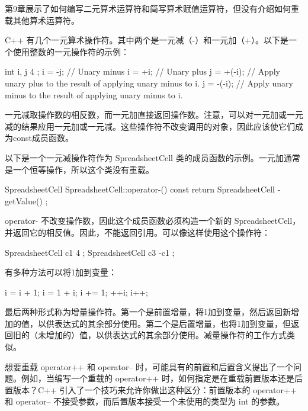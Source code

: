 
第9章展示了如何编写二元算术运算符和简写算术赋值运算符，但没有介绍如何重载其他算术运算符。


C++ 有几个一元算术操作符。其中两个是一元减（-）和一元加（+）。以下是一个使用整数的一元操作符的示例：

\begin{cpp}
int i, j { 4 };
i = -j; // Unary minus
i = +i; // Unary plus
j = +(-i); // Apply unary plus to the result of applying unary minus to i.
j = -(-i); // Apply unary minus to the result of applying unary minus to i.
\end{cpp}

一元减取操作数的相反数，而一元加直接返回操作数。注意，可以对一元加或一元减的结果应用一元加或一元减。这些操作符不改变调用的对象，因此应该使它们成为const成员函数。

以下是一个一元减操作符作为 SpreadsheetCell 类的成员函数的示例。一元加通常是一个恒等操作，所以这个类没有重载。

\begin{cpp}
SpreadsheetCell SpreadsheetCell::operator-() const
{
    return SpreadsheetCell { -getValue() };
}
\end{cpp}

operator- 不改变操作数，因此这个成员函数必须构造一个新的 SpreadsheetCell， 并返回它的相反值。因此，不能返回引用。可以像这样使用这个操作符：

\begin{cpp}
SpreadsheetCell c1 { 4 };
SpreadsheetCell c3 { -c1 };
\end{cpp}


有多种方法可以将1加到变量：

\begin{cpp}
i = i + 1;
i = 1 + i;
i += 1;
++i;
i++;
\end{cpp}

最后两种形式称为增量操作符。第一个是前置增量，将1加到变量，然后返回新增加的值，以供表达式的其余部分使用。第二个是后置增量，也将1加到变量，但返回旧的（未增加的）值，以供表达式的其余部分使用。减量操作符的工作方式类似。

想要重载 operator++ 和 operator-- 时，可能具有的前置和后置含义提出了一个问题。例如，当编写一个重载的 operator++ 时，如何指定是在重载前置版本还是后置版本？C++ 引入了一个技巧来允许你做出这种区分：前置版本的 operator++ 和 operator-- 不接受参数，而后置版本接受一个未使用的类型为 int 的参数。

